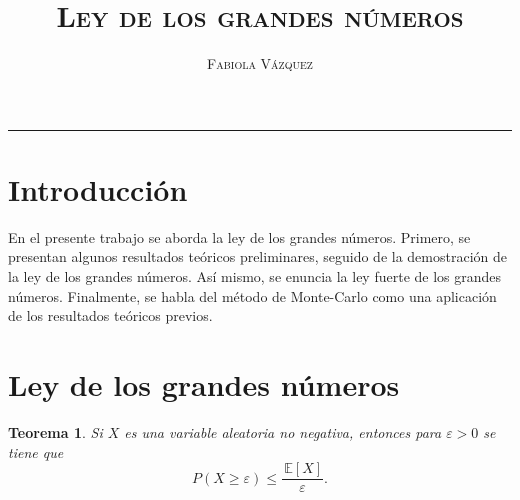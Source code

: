 \documentclass[12pt,letterpaper]{article}
\title{\textsc{Ley de los grandes números}}
\author{\textsc{Fabiola Vázquez}}
\newcommand\esp[1]{\, \mathbb{E} \left\lbrack #1 \right\rbrack}
\newtheorem{teo}{Teorema}
\begin{document}
\maketitle
\hrule 
\section{Introducción}
 En el presente trabajo se aborda la ley de los grandes números. Primero, se presentan algunos resultados teóricos preliminares, seguido de la demostración \cite{snell} de la ley de los grandes números. Así mismo, se enuncia la ley fuerte de los grandes números. Finalmente, se habla del método de Monte-Carlo como una aplicación de los resultados teóricos previos.
\section{Ley de los grandes números}
\begin{teo}
Si $X$ es una variable aleatoria no negativa, entonces para $\varepsilon > 0$ se tiene que
\begin{equation}
P(X\geqslant \varepsilon) \leqslant \frac{\esp{X}}{\varepsilon}.
\end{equation}
\end{teo}
\end{document}
